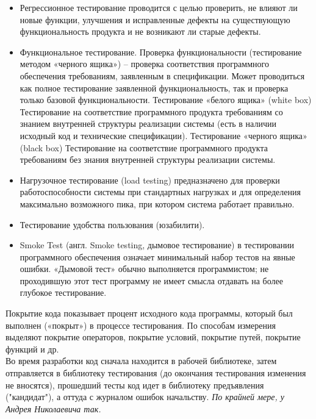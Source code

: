 \documentclass[12pt, a4paper]{article}
\begin{document}
\begin{itemize}
    \item Регрессионное тестирование проводится с целью проверить, не влияют ли новые функции, улучшения и исправленные дефекты на существующую функциональность продукта и не возникают ли старые дефекты.
    \item Функциональное тестирование. Проверка функциональности (тестирование методом «черного ящика») – проверка соответствия программного обеспечения требованиям, заявленным в спецификации. Может проводиться как полное тестирование заявленной функциональность, так и проверка только базовой функциональности. Тестирование «белого ящика» (white box) Тестирование на соответствие программного продукта требованиям со знанием внутренней структуры реализации системы (есть в наличии исходный код и технические спецификации). Тестирование «черного ящика» (black box) Тестирование на соответствие программного продукта требованиям без знания внутренней структуры реализации системы.
    \item Нагрузочное тестирование (load testing) предназначено для проверки работоспособности системы при стандартных нагрузках и для определения максимально возможного пика, при котором система работает правильно.
    \item Тестирование удобства пользования (юзабилити).
    \item Smoke Test (англ. Smoke testing, дымовое тестирование) в тестировании программного обеспечения означает минимальный набор тестов на явные ошибки. «Дымовой тест» обычно выполняется программистом; не проходившую этот тест программу не имеет смысла отдавать на более глубокое тестирование.
\end{itemize}

Покрытие кода показывает процент исходного кода программы, который был выполнен («покрыт») в процессе тестирования. По способам измерения выделяют покрытие операторов, покрытие условий, покрытие путей, покрытие функций и др.\\

Во время разработки код сначала находится в рабочей библиотеке, затем отправляется в библиотеку тестирования (до окончания тестирования изменения не вносятся), прошедший тесты код идет в библиотеку предъявления ("кандидат"{}), а оттуда с журналом ошибок начальству. \textit{По крайней мере, у Андрея Николаевича так.}
\end{document}
